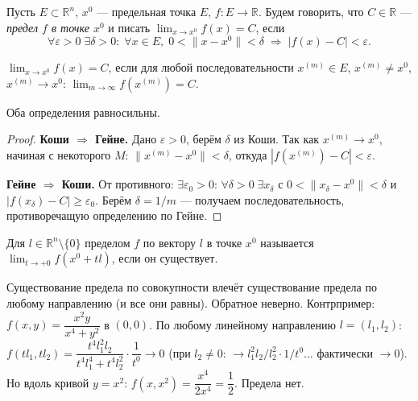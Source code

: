 


\begin{defn}
  Пусть $E \subset \mathbb{R}^n$, $x^0$ --- предельная точка $E$, $f: E \to \mathbb{R}$.
  Будем говорить, что $C \in \mathbb{R}$ --- \emph{предел $f$ в точке $x^0$} и писать
  $\lim_{x \to x^0} f(x) = C$, если
  \[
    \forall\varepsilon>0\;\exists\delta>0:\;
    \forall x \in E,\; 0 < \|x-x^0\| < \delta \;\Rightarrow\; |f(x)-C|<\varepsilon.
  \]
\end{defn}

\begin{defn}
  $\lim_{x\to x^0} f(x) = C$, если для любой последовательности
  $x^{(m)} \in E$, $x^{(m)} \neq x^0$, $x^{(m)} \to x^0$:
  $\lim_{m\to\infty} f(x^{(m)}) = C$.
\end{defn}

\begin{theorem}
  Оба определения равносильны.
  \begin{proof}
    \textbf{Коши $\Rightarrow$ Гейне.} Дано $\varepsilon>0$, берём $\delta$ из Коши.
    Так как $x^{(m)}\to x^0$, начиная с некоторого $M$: $\|x^{(m)}-x^0\|<\delta$, откуда $|f(x^{(m)})-C|<\varepsilon$.

    \textbf{Гейне $\Rightarrow$ Коши.} От противного: $\exists\varepsilon_0>0$: $\forall\delta>0\;\exists x_\delta$
    с $0<\|x_\delta-x^0\|<\delta$ и $|f(x_\delta)-C|\geq\varepsilon_0$.
    Берём $\delta=1/m$ --- получаем последовательность, противоречащую определению по Гейне. \qedhere
  \end{proof}
\end{theorem}

\begin{defn}
  Для $l \in \mathbb{R}^n \setminus \{0\}$ пределом $f$ по вектору $l$ в точке $x^0$ называется
  $\lim_{t\to+0} f(x^0+tl)$, если он существует.
\end{defn}

\begin{note}
  Существование предела по совокупности влечёт существование предела по любому направлению
  (и все они равны). Обратное неверно.
  Контрпример: $f(x,y) = \dfrac{x^2 y}{x^4+y^2}$ в $(0,0)$.
  По любому линейному направлению $l=(l_1,l_2)$:
  $f(tl_1,tl_2) = \dfrac{t^4 l_1^2 l_2}{t^4 l_1^4 + t^4 l_2^2} \cdot \dfrac{1}{t^0} \to 0$
  (при $l_2\neq0$: $\to l_1^2 l_2 / l_2^2 \cdot 1/t^0$... фактически $\to 0$).
  Но вдоль кривой $y = x^2$: $f(x,x^2) = \dfrac{x^4}{2x^4} = \dfrac{1}{2}$. Предела нет.
\end{note}


